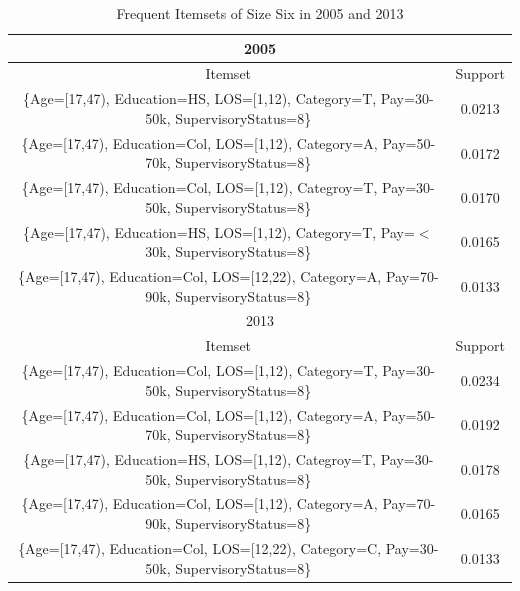 \documentclass{article}
\begin{document}
    \begin{center}
        \begin{table}
            \centering
            \begin{tabular}{ |c|c| }
                \hline
                \multicolumn{2}{|c|}{2005} \\
                \hline
                Itemset & Support \\
                \hline
                \{Age=[17,47),
                Education=HS,
                LOS=[1,12),
                Category=T,
                Pay=30-50k,
                SupervisoryStatus=8\} & 0.0213 \\
                \{Age=[17,47),
                Education=Col,
                LOS=[1,12),
                Category=A,
                Pay=50-70k,
                SupervisoryStatus=8\} & 0.0172 \\
                \{Age=[17,47),
                Education=Col,
                LOS=[1,12),
                Categroy=T,
                Pay=30-50k,
                SupervisoryStatus=8\} & 0.0170 \\
                \{Age=[17,47),
                Education=HS,
                LOS=[1,12),
                Category=T,
                Pay=$<$30k,
                SupervisoryStatus=8\} & 0.0165 \\
                \{Age=[17,47),
                Education=Col,
                LOS=[12,22),
                Category=A,
                Pay=70-90k,
                SupervisoryStatus=8\} & 0.0133 \\
                \hline
                \multicolumn{2}{|c|}{2013} \\
                \hline
                Itemset & Support \\
                \hline
                \{Age=[17,47),
                Education=Col,
                LOS=[1,12),
                Category=T,
                Pay=30-50k,
                SupervisoryStatus=8\} & 0.0234 \\
                \{Age=[17,47),
                Education=Col,
                LOS=[1,12),
                Category=A,
                Pay=50-70k,
                SupervisoryStatus=8\} & 0.0192 \\
                \{Age=[17,47),
                Education=HS,
                LOS=[1,12),
                Categroy=T,
                Pay=30-50k,
                SupervisoryStatus=8\} & 0.0178 \\
                \{Age=[17,47),
                Education=Col,
                LOS=[1,12),
                Category=A,
                Pay=70-90k,
                SupervisoryStatus=8\} & 0.0165 \\
                \{Age=[17,47),
                Education=Col,
                LOS=[12,22),
                Category=C,
                Pay=30-50k,
                SupervisoryStatus=8\} & 0.0133 \\
                \hline
            \end{tabular}
            \caption{Frequent Itemsets of Size Six in 2005 and 2013}
            \label{tab:5}
        \end{table}
    \end{center}
\end{document}
